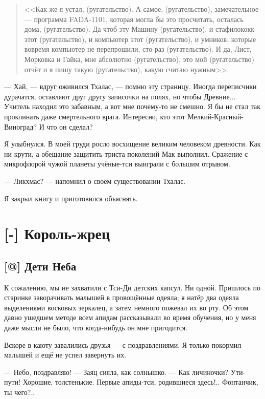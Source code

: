 \begin{quote}
<<Как же я устал, (ругательство).
А самое, (ругательство), замечательное --- программа FADA-1101, которая могла бы это просчитать, осталась дома, (ругательство).
Да чтоб эту Машину (ругательство), и стафилококк этот (ругательство), и компьютер этот (ругательство), и умников, которые вовремя компьютер не перепрошили, сто раз (ругательство).
И да, Лист, Морковка и Гайка, мне абсолютно (ругательство), это мой (ругательство) отчёт и я пишу такую (ругательство), какую считаю нужным>>.
\end{quote}

--- Хай, --- вдруг оживился Тхалас, --- помню эту страницу.
Иногда переписчики дурачатся, оставляют друг другу записочки на полях, но чтобы Древние...
Учитель находил это забавным, а вот мне почему-то не смешно.
Я бы не стал так проклинать даже смертельного врага.
Интересно, кто этот Мелкий-Красный-Виноград?
И что он сделал?

Я улыбнулся. В моей груди росло восхищение великим человеком древности.
Как ни крути, а обещание защитить триста поколений Мак выполнил.
Сражение с микрофлорой чужой планеты учёные-тси выиграли с большим отрывом.

--- Ликхмас? --- напомнил о своём существовании Тхалас.

Я закрыл книгу и приготовился объяснять.

\chapter{[-] Король-жрец}

\section{[@] Дети Неба}

К сожалению, мы не захватили с Тси-Ди детских капсул.
Ни одной.
Пришлось по старинке заворачивать малышей в провощённые одеяла;
я натёр два одеяла выделениями восковых зеркалец, а затем немного пожевал их во рту.
Об этом давно ушедшем методе всем апидам рассказывали во время обучения, но у меня даже мысли не было, что когда-нибудь он мне пригодится.

Вскоре в каюту завалились друзья --- с поздравлениями.
Я только покормил малышей и ещё не успел завернуть их.

--- Небо, поздравляю! --- Заяц сияла, как солнышко.
--- Как личиночки?
Ути-пути!
Хорошие, толстенькие.
Первые апиды-тси, родившиеся здесь!..
Фонтанчик, ты чего?..


